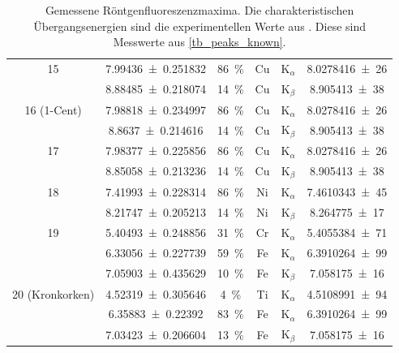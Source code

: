 \documentclass[
	a4paper,
	12pt,
	pagesize,
	ngerman
]{scrartcl}
\begin{document}
\begin{table}[H]
{\begin{tabular}{ c | c | c || c | c | c }
			15 
			& \SI{7.99436+-0.251832}{} &\SI{86}{\%}& Cu & $\text{K}_\alpha$ &  \SI{8,0278416(26)}{} \\
			& \SI{8.88485+-0.218074}{} &\SI{14}{\%}&  Cu &  $\text{K}_\beta$ & \SI{8,905413(38)}{} \\ 
			\hline
			
			16 (1-Cent)
			& \SI{7.98818+-0.234997}{} &\SI{86}{\%}& Cu & $\text{K}_\alpha$ &  \SI{8,0278416(26)}{} \\
			& \SI{8.8637+-0.214616}{} &\SI{14}{\%}& Cu &  $\text{K}_\beta$ & \SI{8,905413(38)}{} \\ 
			\hline
			
			17 
			& \SI{7.98377+-0.225856}{} &\SI{86}{\%}& Cu & $\text{K}_\alpha$ & \SI{8,0278416(26)}{} \\
			& \SI{8.85058+-0.213236}{} &\SI{14}{\%}& Cu & $\text{K}_\beta$ & \SI{8,905413(38)}{} \\ 
			\hline
			
			18 
			& \SI{7.41993+-0.228314}{} &\SI{86}{\%}& Ni & $\text{K}_\alpha$ & \SI{7,4610343(45)}{} \\
			& \SI{8.21747+-0.205213}{} &\SI{14}{\%}& Ni & $\text{K}_\beta$ &   \SI{8,264775(17)}{} \\ 
			\hline
			
			19 
			& \SI{5.40493+-0.248856}{} &\SI{31}{\%}& Cr & $\text{K}_\alpha$ & \SI{5,4055384(71)}{} \\
			& \SI{6.33056+-0.227739}{} &\SI{59}{\%}& Fe & $\text{K}_\alpha$ & \SI{ 6,3910264(99)}{} \\
			& \SI{7.05903+-0.435629}{} &\SI{10}{\%}& Fe &  $\text{K}_\beta $ & \SI{7,058175(16)}{} \\ 
			\hline
			
			20 (Kronkorken) 
			& \SI{4.52319+-0.305646}{} &\SI{4}{\%}& Ti & $\text{K}_\alpha $ &  \SI{4. 5108991(94)}{} \\ 
			& \SI{6.35883+-0.22392}{} &\SI{83}{\%}& Fe & $\text{K}_\alpha $ &  \SI{6,3910264(99)}{} \\
			& \SI{7.03423+-0.206604}{} &\SI{13}{\%}& Fe & $\text{K}_\beta $ &  \SI{7,058175(16)}{} \\ 
			\hline
		\end{tabular}
		}
		\caption{Gemessene Röntgenfluoreszenzmaxima. Die charakteristischen Übergangsenergien sind die experimentellen Werte aus \cite{XRAYDB}. Diese sind Messwerte aus \cref{tb_peaks_known}.} %
		\label{tb_peaks_unknown}
		
	\end{table}
\end{document}
